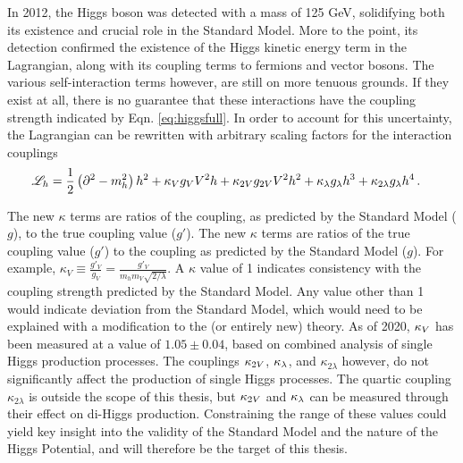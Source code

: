     In 2012, the Higgs boson was detected with a mass of 125 GeV, solidifying both its existence and crucial role in the Standard Model.
    More to the point, its detection confirmed the existence of the Higgs kinetic energy term in the Lagrangian,
        along with its coupling terms to fermions and vector bosons.
    The various self-interaction terms however, are still on more tenuous grounds.
    If they exist at all, there is no guarantee that these interactions have the coupling strength indicated by Eqn. \ref{eq:higgsfull}.
    In order to account for this uncertainty, the Lagrangian can be rewritten with arbitrary scaling factors for the interaction couplings
    \begin{equation} \begin{split} \label{eq:higgskappas}
        \mathscr{L}_h &= \frac{1}{2} \left(\partial^2 - m_h^2 \right) h^2
            + \kappa_{V} g_V V^2 h + \kappa_{2V} g_{2V} V^2 h^2
            + \kappa_{\lambda} g_{\lambda} h^3 + \kappa_{2 \lambda} g_{\lambda} h^4
        \,.
    \end{split} \end{equation}

    The new $\kappa$ terms are ratios of the coupling, as predicted by the Standard Model ($g$), to the true coupling value ($g'$).
    The new $\kappa$ terms are ratios of the true coupling value ($g'$)
        to the coupling as predicted by the Standard Model ($g$).
    For example, $\kappa_V \equiv \frac{g'_V}{g_V} = \frac{g'_V}{m_h m_V \sqrt{2/\lambda}}$.
    A $\kappa$ value of 1 indicates consistency with the coupling strength predicted by the Standard Model.
    Any value other than 1 would indicate deviation from the Standard Model,
        which would need to be explained with a modification to the (or entirely new) theory.
    As of 2020, $\kappa_{V}$ has been measured at a value of $1.05 \pm 0.04$,
        based on combined analysis of single Higgs production processes\cite{paper:higgs_combined}.
    The couplings $\kappa_{2V}$, $\kappa_{\lambda}$, and $\kappa_{2\lambda}$ however, do not significantly affect the production of single Higgs processes.
    The quartic coupling $\kappa_{2\lambda}$ is outside the scope of this thesis,
        but $\kappa_{2V}$ and $\kappa_{\lambda}$ can be measured through their effect on di-Higgs production.
    Constraining the range of these values could yield key insight into the validity of the Standard Model and the nature of the Higgs Potential,
        and will therefore be the target of this thesis.
